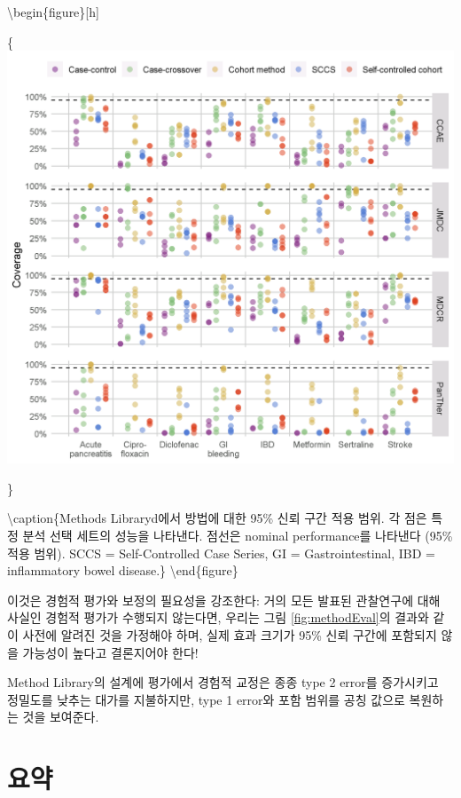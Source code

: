 \documentclass[11pt]{book}
\theoremstyle{definition}
\theoremstyle{definition}
\theoremstyle{definition}
\theoremstyle{remark}
\begin{document}
\textbackslash{}begin\{figure\}{[}h{]}

\{\centering \includegraphics[width=1\linewidth]{images/MethodValidity/methodEval}

\}

\textbackslash{}caption\{Methods Libraryd에서 방법에 대한 95\% 신뢰 구간
적용 범위. 각 점은 특정 분석 선택 세트의 성능을 나타낸다. 점선은 nominal
performance를 나타낸다 (95\% 적용 범위). SCCS = Self-Controlled Case
Series, GI = Gastrointestinal, IBD = inflammatory bowel
disease.\}\label{fig:methodEval} \textbackslash{}end\{figure\}

이것은 경험적 평가와 보정의 필요성을 강조한다: 거의 모든 발표된
관찰연구에 대해 사실인 경험적 평가가 수행되지 않는다면, 우리는 그림
\ref{fig:methodEval}의 결과와 같이 사전에 알려진 것을 가정해야 하며,
실제 효과 크기가 95\% 신뢰 구간에 포함되지 않을 가능성이 높다고
결론지어야 한다!

Method Library의 설계에 평가에서 경험적 교정은 종종 type 2 error를
증가시키고 정밀도를 낮추는 대가를 지불하지만, type 1 error와 포함 범위를
공칭 값으로 복원하는 것을 보여준다.

\section{요약}\label{-15}
\end{document}
